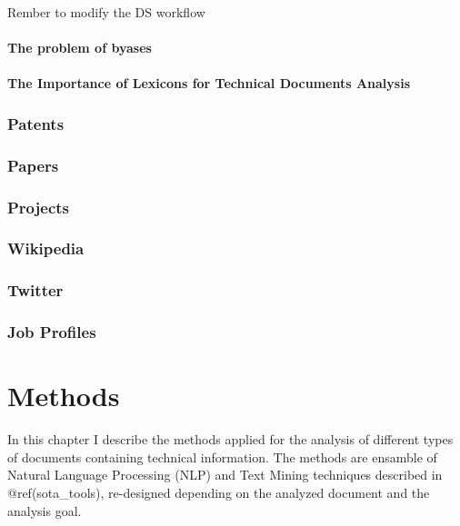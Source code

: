 \documentclass[]{book}
\theoremstyle{definition}
\theoremstyle{definition}
\theoremstyle{definition}
\theoremstyle{remark}
\begin{document}
Rember to modify the DS workflow

\subsubsection{The problem of byases}\label{sotadocumentsunderstandbyas}

\subsubsection{The Importance of Lexicons for Technical Documents
Analysis}\label{sotadocumentsunderstandlexicons}

\subsection{Patents}\label{sotadocumentspatents}

\subsection{Papers}\label{sotadocumentspapers}

\subsection{Projects}\label{sotadocumentsprojects}

\subsection{Wikipedia}\label{sotadocumentswiki}

\subsection{Twitter}\label{sotadocumentstwitter}

\subsection{Job Profiles}\label{sotadocumentsjobs}

\chapter{Methods}\label{methods}

In this chapter I describe the methods applied for the analysis of
different types of documents containing technical information. The
methods are ensamble of Natural Language Processing (NLP) and Text
Mining techniques described in @ref(sota\_tools), re-designed depending
on the analyzed document and the analysis goal.
\end{document}
